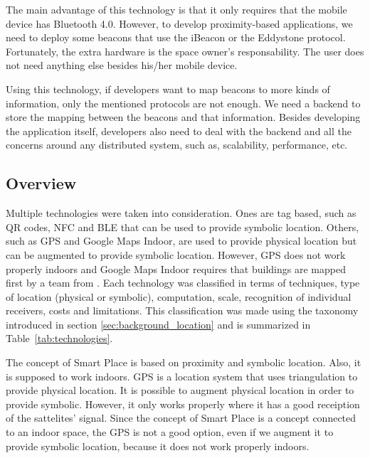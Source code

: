 The main advantage of this technology is that it only requires that the mobile device has Bluetooth 4.0.
However, to develop proximity-based applications, we need to deploy some beacons that use the iBeacon or the Eddystone protocol.
Fortunately, the extra hardware is the space owner's responsability.
The user does not need anything else besides his/her mobile device.

Using this technology, if developers want to map beacons to more kinds of information, only the mentioned protocols are not enough.
We need a backend to store the mapping between the beacons and that information.
Besides developing the application itself, developers also need to deal with the backend and all the concerns around any distributed system, such as, scalability, performance, etc.

\subsection{Overview}
\label{sub:background_overview}
Multiple technologies were taken into consideration.
Ones are tag based, such as \gls{QR} codes, \gls{NFC} and \gls{BLE} that can be used to provide symbolic location.
Others, such as \gls{GPS} and Google Maps Indoor, are used to provide physical location but can be augmented to provide symbolic location.
However, \gls{GPS} does not work properly indoors and Google Maps Indoor requires that buildings are mapped first by a team from .
Each technology was classified in terms of techniques, type of location (physical or symbolic), computation, scale, recognition of individual receivers, costs and limitations.
This classification was made using the taxonomy introduced in section \ref{sec:background_location} and is summarized in Table~\ref{tab:technologies}.



The concept of Smart Place is based on proximity and symbolic location.
Also, it is supposed to work indoors.
\gls{GPS} is a location system that uses triangulation to provide physical location.
It is possible to augment physical location in order to provide symbolic.
However, it only works properly where it has a good receiption of the sattelites' signal.
Since the concept of Smart Place is a concept connected to an indoor space, the \gls{GPS} is not a good option, even if we augment it to provide symbolic location, because it does not work properly indoors.

